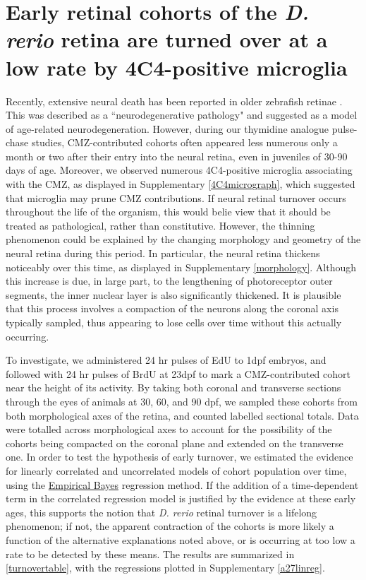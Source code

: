 \section{Early retinal cohorts of the \textit{D. rerio} retina are turned over at a low rate by 4C4-positive microglia}
\label{sec:neuralfate}
Recently, extensive neural death has been reported in older zebrafish retinae \cite{Vanhoucke2018}. This was described as a ``neurodegenerative pathology" and suggested as a model of age-related neurodegeneration. However, during our thymidine analogue pulse-chase studies, CMZ-contributed cohorts often appeared less numerous only a month or two after their entry into the neural retina, even in juveniles of 30-90 days of age. Moreover, we observed numerous 4C4-positive microglia associating with the CMZ, as displayed in Supplementary \autoref{4C4micrograph}, which suggested that microglia may prune CMZ contributions. If neural retinal turnover occurs throughout the life of the organism, this would belie view that it should be treated as pathological, rather than constitutive. However, the thinning phenomenon could be explained by the changing morphology and geometry of the neural retina during this period. In particular, the neural retina thickens noticeably over this time, as displayed in Supplementary \autoref{morphology}. Although this increase is due, in large part, to the lengthening of photoreceptor outer segments, the inner nuclear layer is also significantly thickened. It is plausible that this process involves a compaction of the neurons along the coronal axis typically sampled, thus appearing to lose cells over time without this actually occurring. 

To investigate, we administered 24 hr pulses of EdU to 1dpf embryos, and followed with 24 hr pulses of BrdU at 23dpf to mark a CMZ-contributed cohort near the height of its activity. By taking both coronal and transverse sections through the eyes of animals at 30, 60, and 90 dpf, we sampled these cohorts from both morphological axes of the retina, and counted labelled sectional totals. Data were totalled across morphological axes to account for the possibility of the cohorts being compacted on the coronal plane and extended on the transverse one. In order to test the hypothesis of early turnover, we estimated the evidence for linearly correlated and uncorrelated models of cohort population over time, using the \hyperref[ssec:EmpiricalBayes]{Empirical Bayes} regression method. If the addition of a time-dependent term in the correlated regression model is justified by the evidence at these early ages, this supports the notion that \textit{D. rerio} retinal turnover is a lifelong phenomenon; if not, the apparent contraction of the cohorts is more likely a function of the alternative explanations noted above, or is occurring at too low a rate to be detected by these means. The results are summarized in \autoref{turnovertable}, with the regressions plotted in Supplementary \autoref{a27linreg}.

